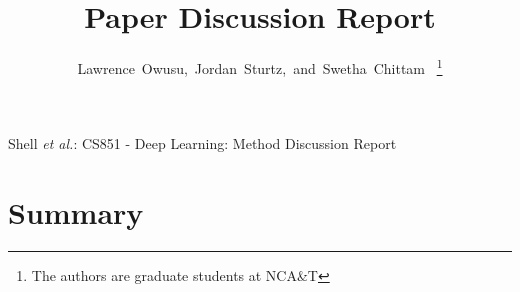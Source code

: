 \documentclass[journal]{IEEEtran}
\begin{document}
%
\title{Paper Discussion Report}

\author{Lawrence~Owusu,~Jordan~Sturtz,~and~Swetha~Chittam~%
  \thanks{The authors are graduate students at NCA\&T}%
}

%

%
{Shell \MakeLowercase{\textit{et al.}}: CS851 - Deep Learning: Method Discussion Report}

\maketitle




%
\IEEEpeerreviewmaketitle

\section{Summary}
\end{document}
